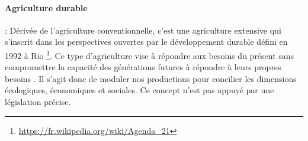 \documentclass[../thesis.tex]{subfiles}
\begin{document}
    
    
    \paragraph{Agriculture durable} :
    Dérivée de l'agriculture conventionnelle, c'est une agriculture extensive qui s'inscrit dans les perspectives ouvertes par le développement durable défini en 1992 à Rio \footnote{\url{https://fr.wikipedia.org/wiki/Agenda_21}}. Ce type d'agriculture vise à \og répondre aux besoins du présent sans compromettre la capacité des générations futures à répondre à leurs propres besoins \fg. Il s'agit donc de moduler nos productions pour concilier les dimensions écologiques, économiques et sociales. Ce concept n'est pas appuyé par une législation précise.
    
\end{document}
